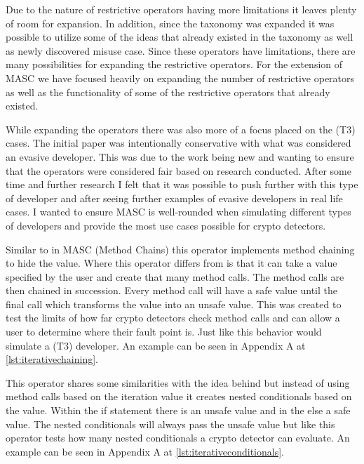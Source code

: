 Due to the nature of restrictive operators having more limitations it leaves plenty of room for expansion. In addition, since the taxonomy was expanded it was possible to utilize some of the ideas that already existed in the taxonomy as well as newly discovered misuse case. Since these operators have limitations, there are many possibilities for expanding the restrictive operators. For the extension of MASC we have focused heavily on expanding the number of restrictive operators as well as the functionality of some of the restrictive operators that already existed.

While expanding the operators there was also more of a focus placed on the (T3) cases. The initial paper was intentionally conservative with what was considered an evasive developer. This was due to the work being new and wanting to ensure that the operators were considered fair based on research conducted. After some time and further research I felt that it was possible to push further with this type of developer and after seeing further examples of evasive developers in real life cases. I wanted to ensure MASC is well-rounded when simulating different types of developers and provide the most use cases possible for crypto detectors.


 Similar to in MASC  (Method Chains) this operator implements method chaining to hide the value. Where this operator differs from  is that it can take a value specified by the user and create that many method calls. The method calls are then chained in succession. Every method call will have a safe value until the final call which transforms the value into an unsafe value. This was created to test the limits of how far crypto detectors check method calls and can allow a user to determine where their fault point is. Just like  this behavior would simulate a (T3) developer. An example can be seen in Appendix A at \ref{lst:iterativechaining}.

 This operator shares some similarities with the idea behind  but instead of using method calls based on the iteration value it creates nested conditionals based on the value. Within the if statement there is an unsafe value and in the else a safe value. The nested conditionals will always pass the unsafe value but like  this operator tests how many nested conditionals a crypto detector can evaluate. An example can be seen in Appendix A at \ref{lst:iterativeconditionals}.

